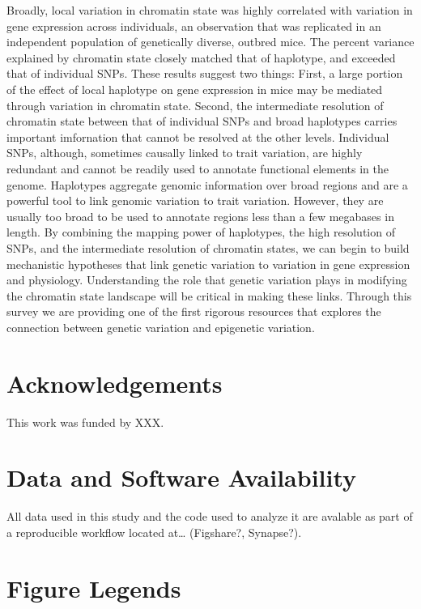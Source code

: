 \documentclass[10pt,letterpaper]{article}
\begin{document}
Broadly, local variation in chromatin state was highly correlated with
variation in gene expression across individuals, an observation that was
replicated in an independent population of genetically diverse, outbred
mice. The percent variance explained by chromatin state closely matched
that of haplotype, and exceeded that of individual SNPs. These results
suggest two things: First, a large portion of the effect of local
haplotype on gene expression in mice may be mediated through variation
in chromatin state. Second, the intermediate resolution of chromatin
state between that of individual SNPs and broad haplotypes carries
important imfornation that cannot be resolved at the other levels.
Individual SNPs, although, sometimes causally linked to trait variation,
are highly redundant and cannot be readily used to annotate functional
elements in the genome. Haplotypes aggregate genomic information over
broad regions and are a powerful tool to link genomic variation to trait
variation. However, they are usually too broad to be used to annotate
regions less than a few megabases in length. By combining the mapping
power of haplotypes, the high resolution of SNPs, and the intermediate
resolution of chromatin states, we can begin to build mechanistic
hypotheses that link genetic variation to variation in gene expression
and physiology. Understanding the role that genetic variation plays in
modifying the chromatin state landscape will be critical in making these
links. Through this survey we are providing one of the first rigorous
resources that explores the connection between genetic variation and
epigenetic variation.

\hypertarget{acknowledgements}{%
\section{Acknowledgements}\label{acknowledgements}}

This work was funded by XXX.

\hypertarget{data-and-software-availability}{%
\section{Data and Software
Availability}\label{data-and-software-availability}}

All data used in this study and the code used to analyze it are avalable
as part of a reproducible workflow located at\ldots{} (Figshare?,
Synapse?).

\hypertarget{figure-legends}{%
\section{Figure Legends}\label{figure-legends}}
\end{document}
